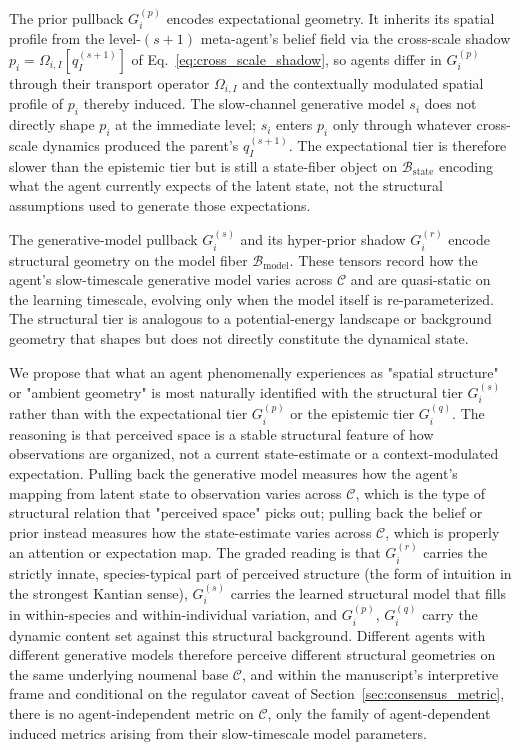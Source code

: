 \documentclass[11pt]{article}
\begin{document}
The prior pullback $G_i^{(p)}$ encodes expectational geometry. It inherits its spatial profile from the level-$(s{+}1)$ meta-agent's belief field via the cross-scale shadow $p_i = \Omega_{i,I}[q_I^{(s+1)}]$ of Eq.~\eqref{eq:cross_scale_shadow}, so agents differ in $G_i^{(p)}$ through their transport operator $\Omega_{i,I}$ and the contextually modulated spatial profile of $p_i$ thereby induced. The slow-channel generative model $s_i$ does not directly shape $p_i$ at the immediate level; $s_i$ enters $p_i$ only through whatever cross-scale dynamics produced the parent's $q_I^{(s+1)}$. The expectational tier is therefore slower than the epistemic tier but is still a state-fiber object on $\mathcal{B}_{\mathrm{state}}$ encoding what the agent currently expects of the latent state, not the structural assumptions used to generate those expectations.

The generative-model pullback $G_i^{(s)}$ and its hyper-prior shadow $G_i^{(r)}$ encode structural geometry on the model fiber $\mathcal{B}_{\mathrm{model}}$. These tensors record how the agent's slow-timescale generative model varies across $\mathcal{C}$ and are quasi-static on the learning timescale, evolving only when the model itself is re-parameterized. The structural tier is analogous to a potential-energy landscape or background geometry that shapes but does not directly constitute the dynamical state.

We propose that what an agent phenomenally experiences as "spatial structure" or "ambient geometry" is most naturally identified with the structural tier $G_i^{(s)}$ rather than with the expectational tier $G_i^{(p)}$ or the epistemic tier $G_i^{(q)}$. The reasoning is that perceived space is a stable structural feature of how observations are organized, not a current state-estimate or a context-modulated expectation. Pulling back the generative model measures how the agent's mapping from latent state to observation varies across $\mathcal{C}$, which is the type of structural relation that "perceived space" picks out; pulling back the belief or prior instead measures how the state-estimate varies across $\mathcal{C}$, which is properly an attention or expectation map. The graded reading is that $G_i^{(r)}$ carries the strictly innate, species-typical part of perceived structure (the form of intuition in the strongest Kantian sense), $G_i^{(s)}$ carries the learned structural model that fills in within-species and within-individual variation, and $G_i^{(p)}$, $G_i^{(q)}$ carry the dynamic content set against this structural background. Different agents with different generative models therefore perceive different structural geometries on the same underlying noumenal base $\mathcal{C}$, and within the manuscript's interpretive frame and conditional on the regulator caveat of Section~\ref{sec:consensus_metric}, there is no agent-independent metric on $\mathcal{C}$, only the family of agent-dependent induced metrics arising from their slow-timescale model parameters.
\end{document}
